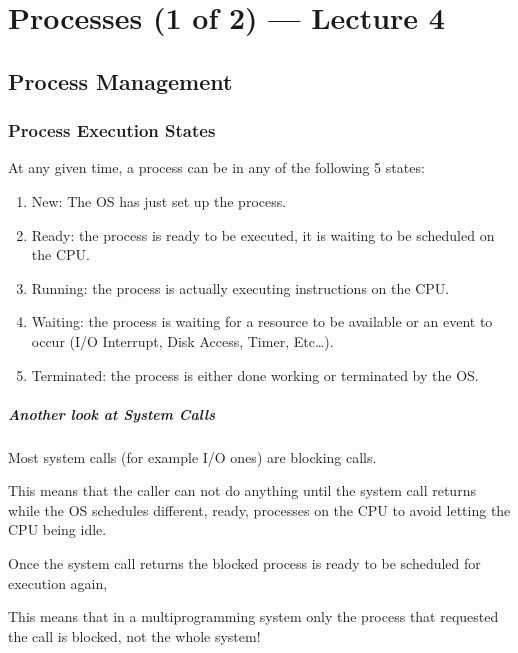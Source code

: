 \documentclass[openright, twoside]{report}
\theoremstyle{definition}
\theoremstyle{example}
\begin{document}
\chapter{Processes (1 of 2) --- Lecture 4}
	\section{Process Management}
		\subsection{Process Execution States}
		\label{sec:procStates}
				At any given time, a process can be in any of the following 5 states:
				\begin{enumerate}
					\item New: The OS has just set up the process.
					\item Ready: the process is ready to be executed, it is waiting to be scheduled on the CPU.
					\item Running: the process is actually executing instructions on the CPU.
					\item Waiting: the process is waiting for a resource to be available or an event to occur (I/O Interrupt, Disk Access, Timer, Etc\dots).
					\item Terminated: the process is either done working or terminated by the OS.
				\end{enumerate}

				
				\paragraph{Another look at System Calls} Most system calls (for example I/O ones) 
				are blocking calls. 

				This means that the caller can not do anything until the system call returns 
				while the OS schedules different, ready, processes on the CPU
				to avoid letting the CPU being idle. 
				
				Once the system call returns the blocked process is ready to be scheduled 
				for execution again,

				This means that in a multiprogramming system only the process that 
				requested the call is blocked, not the whole system!
\end{document}
